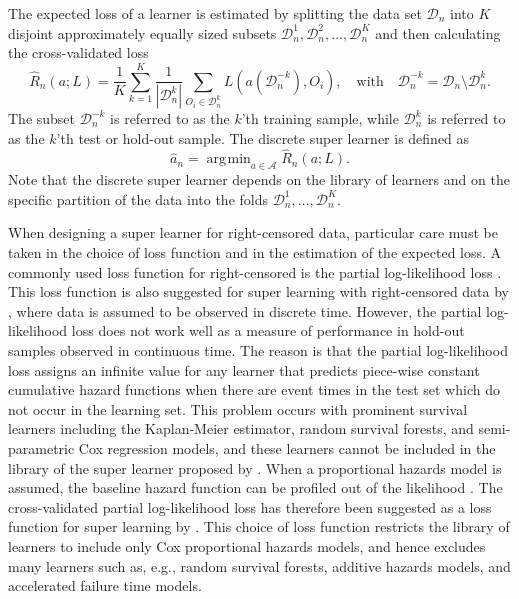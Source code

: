 \documentclass[a4paper,danish]{article}
\theoremstyle{plain} %
\numberwithin{theorem}{section}
\theoremstyle{definition} %
\theoremstyle{remark}
\newcommand{\1}{\mathds{1}}
\DeclareMathOperator*{\argmin}{\arg\!\min}
\newcommand{\data}{\ensuremath{\mathcal{D}}}
\begin{document}
The expected loss of a learner is estimated by splitting the data set
$\data_n$ into $K$ disjoint approximately equally sized subsets
\(\data_n^1, \data_n^2, \dots, \data_n^K \) and then calculating the
cross-validated loss
\begin{equation}
  \label{eq:cv-risk-est}
  \hat{R}_n(a; L) =
  \frac{1}{K}\sum_{k=1}^{K}
  \frac{1}{| \data_n^{k} |}\sum_{O_i \in \data_n^{k}}
  L
  {
    \left(
      a{ (\data_n^{-k})}
      , O_i
    \right)
  },
  \quad \text{with} \quad
  \data_n^{-k} = \data_n \setminus \data_n^{k}.
\end{equation}
The subset \(\data_n^{-k}\) is referred to as the \(k\)'th training
sample, while \(\data_n^{k}\) is referred to as the \(k\)'th test or
hold-out sample.
The discrete super learner is defined as
\begin{equation*}
\hat{a}_n = \argmin_{a\in\mathcal A}\hat{R}_n(a; L).
\end{equation*}
Note that the discrete super learner depends on the library of
learners and on the specific partition of the data into the folds
\( \data_n^1, \dots, \data_n^K \).

When designing a super learner for right-censored data, particular
care must be taken in the choice of loss function and in the
estimation of the expected loss. A commonly used loss function for
right-censored is the partial log-likelihood loss
\citep[e.g.,][]{li2016regularized,yao2017deep,lee2018deephit,katzman2018deepsurv,gensheimer2019scalable,lee2021boosted,kvamme2021continuous}.
This loss function is also suggested for super learning with
right-censored data by \cite{polley2011-sl-cens}, where data is
assumed to be observed in discrete time. However, the partial
log-likelihood loss does not work well as a measure of performance in
hold-out samples observed in continuous time. The reason is that the
partial log-likelihood loss assigns an infinite value for any learner
that predicts piece-wise constant cumulative hazard functions when
there are event times in the test set which do not occur in the
learning set. This problem occurs with prominent survival learners
including the Kaplan-Meier estimator, random survival forests, and
semi-parametric Cox regression models, and these learners cannot be
included in the library of the super learner proposed by
\cite{polley2011-sl-cens}. When a proportional hazards model is
assumed, the baseline hazard function can be profiled out of the
likelihood \citep{cox1972regression}. The cross-validated partial
log-likelihood loss \citep{verweij1993cross} has therefore been
suggested as a loss function for super learning by
\cite{golmakani2020super}. This choice of loss function restricts the
library of learners to include only Cox proportional hazards models,
and hence excludes many learners such as, e.g., random survival
forests, additive hazards models, and accelerated failure time models.
\end{document}
